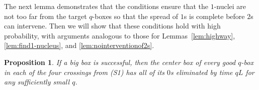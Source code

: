 \documentclass{article}
\numberwithin{equation}{section}
\newtheorem{prop}[theorem]{Proposition}
\begin{document}

The next lemma demonstrates that 
the conditions ensure that the $1$-nuclei are not too far from the target $q$-boxes so that the spread of $1$s is complete before $2$s can intervene. Then we will show that these conditions hold with high probability, with arguments analogous to those for 
Lemmas~\ref{lem:highway}, \ref{lem:find1-nucleus}, and \ref{lem:nointerventionof2s}.

\begin{prop}\label{prop:bigboxfilling}
    If a big box is successful, then the center box of every good $q$-box in each of the four crossings from (S1) has all of its $0$s eliminated by time $qL$ for any sufficiently small $q$.
\end{prop}
\end{document}
